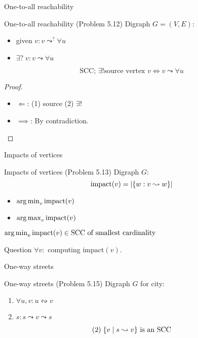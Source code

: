 \begin{frame}{One-to-all reachability}
  \begin{exampleblock}{One-to-all reachability (Problem 5.12)}
	Digraph $G = (V, E)$:
    \begin{itemize}
      \item given $v: v \leadsto^{?} \forall u$
      \item $\exists?\; v: v \leadsto \forall u$
    \end{itemize}
  \end{exampleblock}

  \pause
  \[
	\text{SCC; } \exists! \text{source vertex } v \iff v \leadsto \forall u
  \]

  \pause
  \begin{proof}
	\begin{itemize}
	  \item $\Longleftarrow$: (1) source (2) $\exists !$
		\pause
	  \item $\implies$: By contradiction. 
	\end{itemize}
  \end{proof}
\end{frame}
\begin{frame}{Impacts of vertices}
  \begin{exampleblock}{Impacts of vertices (Problem 5.13)}
	Digraph $G$:
	\[
	  \text{impact}(v) = |\{w: v \leadsto w\}|
	\]

	\begin{itemize}
	  \item $\operatorname*{arg\,min}_{v} \text{impact}(v)$
	  \item $\operatorname*{arg\,max}_{v} \text{impact}(v)$
	\end{itemize}
  \end{exampleblock}

  \pause
  \vspace{0.50cm}
  \centerline{$\operatorname*{arg\,min}_{v} \text{impact}(v) \in \text{SCC of smallest cardinality}$}

  \pause
  \begin{alertblock}{Question}
	$\forall v:$ computing $\text{impact}(v)$.
  \end{alertblock}
\end{frame}
\begin{frame}{One-way streets}
  \begin{exampleblock}{One-way streets (Problem 5.15)}
	Digraph $G$ for city:
    \begin{enumerate}
      \item $\forall u,v: u \leftrightsquigarrow v$
      \item $s: s \leadsto v \leadsto s$
    \end{enumerate}
  \end{exampleblock}

  \pause
  \[
	(2)\; \{v \mid s \leadsto v\} \text{ is an SCC}
  \]
\end{frame}
